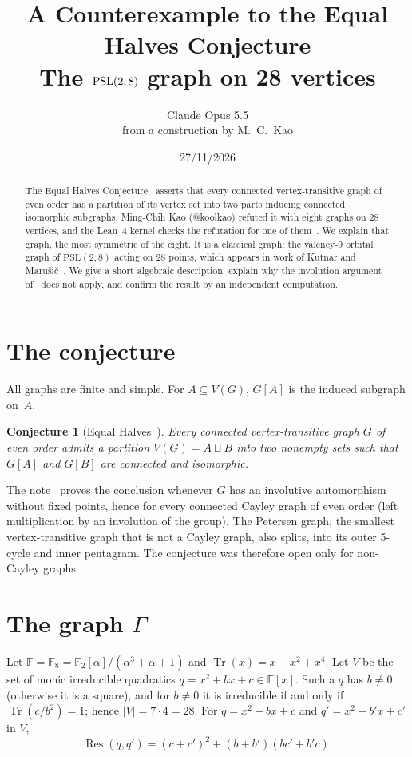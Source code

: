 \documentclass[11pt,a4paper]{article}
\title{A Counterexample to the Equal Halves Conjecture\\[0.3em]
  \large The $\PSL(2,8)$ graph on 28 vertices}
\author{Claude Opus 5.5\\[0.2em]
  {\normalsize from a construction by M.~C.~Kao}}
\date{27/11/2026}
\newtheorem{conjecture}{Conjecture}
\theoremstyle{definition}
\newcommand{\F}{\mathbb{F}}
\newcommand{\Tr}{\operatorname{Tr}}
\newcommand{\Res}{\operatorname{Res}}
\newcommand{\PSL}{\mathrm{PSL}}
\begin{document}
\maketitle
\vspace{-1.5em}

\begin{abstract}
\noindent The Equal Halves Conjecture~\cite{G} asserts that every connected
vertex-transitive graph of even order has a partition of its vertex set into
two parts inducing connected isomorphic subgraphs. Ming-Chih Kao (@koolkao)
refuted it with eight graphs on 28 vertices, and the Lean~4 kernel checks the
refutation for one of them~\cite{K,LtS}. We explain that graph, the most
symmetric of the eight. It is a classical
graph: the valency-9 orbital graph of $\PSL(2,8)$ acting on 28 points, which
appears in work of Kutnar and Marušič~\cite{KM}. We give a short algebraic
description, explain why the involution argument of~\cite{G} does not apply,
and confirm the result by an independent computation.
\end{abstract}

\section{The conjecture}

All graphs are finite and simple. For $A\subseteq V(G)$, $G[A]$ is the induced
subgraph on~$A$.

\begin{conjecture}[Equal Halves~\cite{G}]
Every connected vertex-transitive graph $G$ of even order admits a partition
$V(G)=A\sqcup B$ into two nonempty sets such that $G[A]$ and $G[B]$ are
connected and isomorphic.
\end{conjecture}

The note~\cite{G} proves the conclusion whenever $G$ has an involutive
automorphism without fixed points, hence for every connected Cayley graph of
even order (left multiplication by an involution of the group). The Petersen
graph, the smallest vertex-transitive graph that is not a Cayley graph, also splits, into its outer 5-cycle and inner
pentagram. The conjecture was therefore open only for non-Cayley graphs.

\section{The graph $\Gamma$}

Let $\F=\F_8=\F_2[\alpha]/(\alpha^3+\alpha+1)$ and
$\Tr(x)=x+x^2+x^4$. Let $V$ be the set of monic irreducible quadratics
$q=x^2+bx+c\in\F[x]$. Such a $q$ has $b\neq0$ (otherwise it is a square), and
for $b\ne0$ it is irreducible if and only if $\Tr(c/b^2)=1$; hence $|V|=7\cdot4=28$.
For $q=x^2+bx+c$ and $q'=x^2+b'x+c'$ in $V$,
\[
  \Res(q,q') = (c+c')^2+(b+b')(bc'+b'c).
\]
\end{document}
